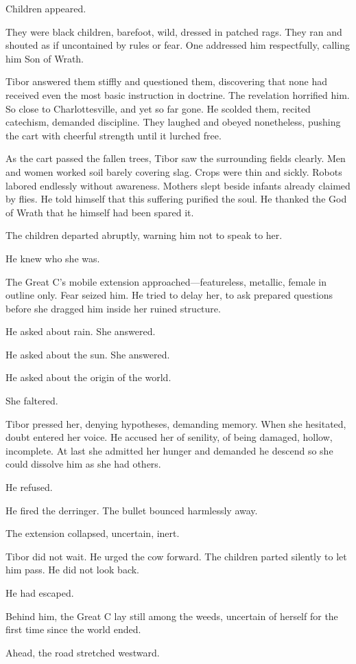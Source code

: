 Children appeared.

They were black children, barefoot, wild, dressed in patched rags. They ran and shouted as if uncontained by rules or fear. One addressed him respectfully, calling him Son of Wrath.

Tibor answered them stiffly and questioned them, discovering that none had received even the most basic instruction in doctrine. The revelation horrified him. So close to Charlottesville, and yet so far gone. He scolded them, recited catechism, demanded discipline. They laughed and obeyed nonetheless, pushing the cart with cheerful strength until it lurched free.

As the cart passed the fallen trees, Tibor saw the surrounding fields clearly. Men and women worked soil barely covering slag. Crops were thin and sickly. Robots labored endlessly without awareness. Mothers slept beside infants already claimed by flies. He told himself that this suffering purified the soul. He thanked the God of Wrath that he himself had been spared it.

The children departed abruptly, warning him not to speak to her.

He knew who she was.

The Great C’s mobile extension approached—featureless, metallic, female in outline only. Fear seized him. He tried to delay her, to ask prepared questions before she dragged him inside her ruined structure.

He asked about rain. She answered.

He asked about the sun. She answered.

He asked about the origin of the world.

She faltered.

Tibor pressed her, denying hypotheses, demanding memory. When she hesitated, doubt entered her voice. He accused her of senility, of being damaged, hollow, incomplete. At last she admitted her hunger and demanded he descend so she could dissolve him as she had others.

He refused.

He fired the derringer. The bullet bounced harmlessly away.

The extension collapsed, uncertain, inert.

Tibor did not wait. He urged the cow forward. The children parted silently to let him pass. He did not look back.

He had escaped.

Behind him, the Great C lay still among the weeds, uncertain of herself for the first time since the world ended.

Ahead, the road stretched westward.

